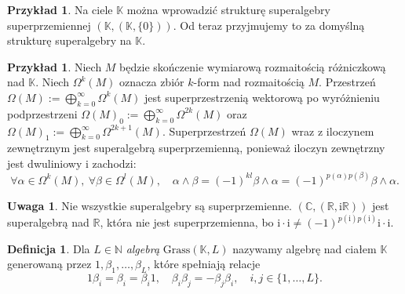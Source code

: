 \documentclass[11pt,a4paper]{report}
\theoremstyle{definition}
\newtheorem{example}[theorem]{Przykład}
\newtheorem{definition}[theorem]{Definicja}
\newtheorem{remark}[theorem]{Uwaga}
\newcommand{\im}{\mathrm{i}}
\begin{document}
\begin{example}
	Na ciele $\mathbb{K}$ można wprowadzić strukturę superalgebry superprzemiennej $(\mathbb{K},(\mathbb{K},\{ 0 \}))$. Od teraz przyjmujemy to za domyślną strukturę superalgebry na $\mathbb{K}$.
\end{example}

\begin{example}
	\label{superalgebra_form}
	Niech $M$ będzie skończenie wymiarową rozmaitością różniczkową nad $\mathbb{K}$. Niech $\Omega^k(M)$ oznacza zbiór $k$-form nad rozmaitością $M$. Przestrzeń $\Omega(M) := \bigoplus_{k=0}^{\infty} \Omega^k(M)$ jest superprzestrzenią wektorową po wyróżnieniu podprzestrzeni $\Omega(M)_0 := \bigoplus_{k=0}^{\infty} \Omega^{2k}(M)$ oraz $\Omega(M)_1 := \bigoplus_{k=0}^{\infty} \Omega^{2k+1}(M)$. Superprzestrzeń $\Omega(M)$ wraz z iloczynem zewnętrznym jest superalgebrą superprzemienną, ponieważ iloczyn zewnętrzny jest dwuliniowy i zachodzi:
	\begin{equation*}
		\forall \alpha \in \Omega^{k}(M),\ \forall \beta \in \Omega^{l}(M), \quad \alpha \wedge \beta = (-1)^{kl} \beta \wedge \alpha = (-1)^{p(\alpha)p(\beta)} \beta \wedge \alpha.
	\end{equation*}
\end{example}
\begin{remark}
	Nie wszystkie superalgebry są superprzemienne. $(\mathbb{C},(\mathbb{R},\im \mathbb{R}))$ jest superalgebrą nad $\mathbb{R}$, która nie jest superprzemienna, bo $\im \cdot \im \neq (-1)^{p(\im)p(\im)}\im \cdot \im.$
\end{remark}
\begin{definition}
	\label{def:grassmann_algebra}
	Dla $L \in \mathbb{N}$ \textit{algebrą} $\mathrm{Grass}(\mathbb{K},L)$  nazywamy algebrę nad ciałem $\mathbb{K}$ generowaną przez $1, \beta_{1}, \ldots, \beta_{L}$, które spełniają relacje
	\begin{equation}
		1\beta_{i} = \beta_{i} = \beta_{i}1, \quad \beta_{i} \beta_{j} = - \beta_{j} \beta_{i}, \quad i,j \in \{ 1, \ldots, L \}.
		\label{eq:grassmann_com}
	\end{equation}
\end{definition}
\end{document}
